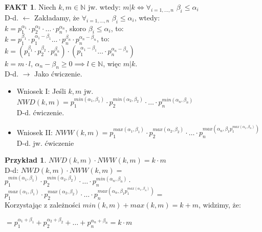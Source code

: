 \documentclass{article}
\theoremstyle{definition}
\theoremstyle{definition}
\theoremstyle{definition}
\newtheorem{pk}{Przykład}[subsection]
\theoremstyle{definition}
\newtheorem*{fakt}{FAKT}
\begin{document}
\begin{fakt}
    Niech $k,m\in\mathbb{N}$ jw. wtedy: $m|k \iff \forall_{i=1,...,n}$ $\beta_i \leq \alpha_i$\\
    D-d. $\leftarrow$ Zakładamy, że $\forall_{i=1,...,n}$ $\beta_i \leq \alpha_i$, wtedy:\\
    $k=p_1^{\alpha_1}\cdot p_2^{\alpha_2}\cdot \dots \cdot p_n^{\alpha_n}$, skoro $\beta_i \leq \alpha_i$, to:\\
    $k=p_1^{\beta_1}\cdot p_1^{\alpha_1-\beta_1} \dots \cdot p_n^{\beta_n}\cdot p_n^{\alpha_n-\beta_n}$, to:\\
    $k=(p_1^{\beta_1}\cdot p_2^{\beta_2}\cdot p_n^{\beta_n}) \cdot (p_1^{\alpha_1-\beta_1} \dots \cdot p_n^{\alpha_n-\beta_n})$\\
    $k=m\cdot l$, $\alpha_n - \beta_n \geq 0 \implies l\in\mathbb{N}$, więc $m|k$.\\
    D-d. $\rightarrow$ Jako ćwiczenie.
\end{fakt}

\begin{itemize}
\item Wniosek I: Jeśli $k,m$ jw. $NWD(k,m)=p_1^{min(\alpha_1, \beta_1)} \cdot p_2^{min(\alpha_2, \beta_2)} \cdot \dots \cdot p_n^{min(\alpha_n, \beta_n)}$\\
D-d. ćwiczenie.

\item Wniosek II: $NWW(k,m)=p_1^{max(\alpha_1,\beta_1)} \cdot p_2^{max(\alpha_2,\beta_2)} \cdot \dots \cdot p_n^{max(\alpha_n,\beta_1p_1^{max(\alpha_1,\beta_n)})}$\\
D-d. jw. ćwiczenie
\end{itemize}

\begin{pk}
    $NWD(k,m)\cdot NWW(k,m) = k\cdot m$\\
    D-d: $NWD(k,m)\cdot NWW(k,m)=$\\
    $p_1^{min(\alpha_1, \beta_1)} \cdot p_2^{min(\alpha_2, \beta_2)} \cdot \dots \cdot p_n^{min(\alpha_n, \beta_n)} \cdot$
    $p_1^{max(\alpha_1,\beta_1)} \cdot p_2^{max(\alpha_2,\beta_2)} \cdot \dots \cdot p_n^{max(\alpha_n,\beta_1p_1^{max(\alpha_1,\beta_n)})}=$\\
    Korzystając z zależności $min(k,m)+max(k,m)=k+m$, widzimy, że:
    \begin{center}
    $=p_1^{\alpha_1+\beta_1} + p_2^{\alpha_2+\beta_2} + \dots + p_n^{\alpha_n+\beta_n} = k\cdot m$
    \end{center}
\end{pk}
\end{document}
